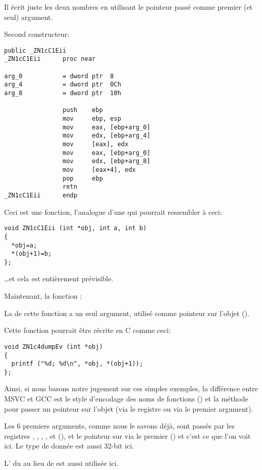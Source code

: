 Il écrit juste les deux nombres en utilisant le pointeur passé comme premier (et
seul) argument.

Second constructeur:

\begin{lstlisting}[style=customasmx86]
                public _ZN1cC1Eii
_ZN1cC1Eii      proc near

arg_0           = dword ptr  8
arg_4           = dword ptr  0Ch
arg_8           = dword ptr  10h

                push    ebp
                mov     ebp, esp
                mov     eax, [ebp+arg_0]
                mov     edx, [ebp+arg_4]
                mov     [eax], edx
                mov     eax, [ebp+arg_0]
                mov     edx, [ebp+arg_8]
                mov     [eax+4], edx
                pop     ebp
                retn
_ZN1cC1Eii      endp
\end{lstlisting}

Ceci est une fonction, l'analogue d'une qui pourrait ressembler à ceci:

\begin{lstlisting}[style=customc]
void ZN1cC1Eii (int *obj, int a, int b)
{
  *obj=a;
  *(obj+1)=b;
};
\end{lstlisting}

\dots et cela est entièrement prévisible.

Maintenant, la fonction :



La  de cette fonction a un seul argument, utilisé comme
pointeur sur l'objet (\ITthis).

Cette fonction pourrait être récrite en C comme ceci:

\begin{lstlisting}[style=customc]
void ZN1c4dumpEv (int *obj)
{
  printf ("%d; %d\n", *obj, *(obj+1));
};
\end{lstlisting}

Ainsi, si nous basons notre jugement sur ces simples exemples, la différence entre
MSVC et GCC est le style d'encodage des noms de fonctions () et
la méthode pour passer un pointeur sur l'objet (via le registre \ECX ou via le premier
argument).


Les 6 premiers arguments, comme nous le savons déjà, sont passés par les registres
\RDI, \RSI, \RDX, \RCX,  et  (\SysVABI),
et le pointeur sur \ITthis via le premier (\RDI) et c'est ce que l'on voit ici.
Le type de donnée \Tint est aussi 32-bit ici.

L' du \JMP au lieu de \RET est aussi utilisée ici.



